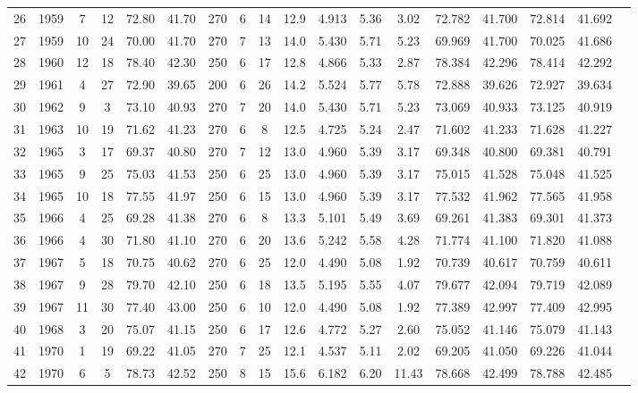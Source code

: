 \begin{longtable}{cccccccccccccccccc}
  26 & 1959 & 7 & 12 & 72.80 & 41.70 & 270 & 6 & 14 & 12.9 & 4.913 & 5.36 & 3.02 & 72.782 & 41.700 & 72.814 & 41.692 \\ 
  27 & 1959 & 10 & 24 & 70.00 & 41.70 & 270 & 7 & 13 & 14.0 & 5.430 & 5.71 & 5.23 & 69.969 & 41.700 & 70.025 & 41.686 \\ 
  28 & 1960 & 12 & 18 & 78.40 & 42.30 & 250 & 6 & 17 & 12.8 & 4.866 & 5.33 & 2.87 & 78.384 & 42.296 & 78.414 & 42.292 \\ 
  29 & 1961 & 4 & 27 & 72.90 & 39.65 & 200 & 6 & 26 & 14.2 & 5.524 & 5.77 & 5.78 & 72.888 & 39.626 & 72.927 & 39.634 \\ 
  30 & 1962 & 9 & 3 & 73.10 & 40.93 & 270 & 7 & 20 & 14.0 & 5.430 & 5.71 & 5.23 & 73.069 & 40.933 & 73.125 & 40.919 \\ 
  31 & 1963 & 10 & 19 & 71.62 & 41.23 & 270 & 6 & 8 & 12.5 & 4.725 & 5.24 & 2.47 & 71.602 & 41.233 & 71.628 & 41.227 \\ 
  32 & 1965 & 3 & 17 & 69.37 & 40.80 & 270 & 7 & 12 & 13.0 & 4.960 & 5.39 & 3.17 & 69.348 & 40.800 & 69.381 & 40.791 \\ 
  33 & 1965 & 9 & 25 & 75.03 & 41.53 & 250 & 6 & 25 & 13.0 & 4.960 & 5.39 & 3.17 & 75.015 & 41.528 & 75.048 & 41.525 \\ 
  34 & 1965 & 10 & 18 & 77.55 & 41.97 & 250 & 6 & 15 & 13.0 & 4.960 & 5.39 & 3.17 & 77.532 & 41.962 & 77.565 & 41.958 \\ 
  35 & 1966 & 4 & 25 & 69.28 & 41.38 & 270 & 6 & 8 & 13.3 & 5.101 & 5.49 & 3.69 & 69.261 & 41.383 & 69.301 & 41.373 \\ 
  36 & 1966 & 4 & 30 & 71.80 & 41.10 & 270 & 6 & 20 & 13.6 & 5.242 & 5.58 & 4.28 & 71.774 & 41.100 & 71.820 & 41.088 \\ 
  37 & 1967 & 5 & 18 & 70.75 & 40.62 & 270 & 6 & 25 & 12.0 & 4.490 & 5.08 & 1.92 & 70.739 & 40.617 & 70.759 & 40.611 \\ 
  38 & 1967 & 9 & 28 & 79.70 & 42.10 & 250 & 6 & 18 & 13.5 & 5.195 & 5.55 & 4.07 & 79.677 & 42.094 & 79.719 & 42.089 \\ 
  39 & 1967 & 11 & 30 & 77.40 & 43.00 & 250 & 6 & 10 & 12.0 & 4.490 & 5.08 & 1.92 & 77.389 & 42.997 & 77.409 & 42.995 \\ 
  40 & 1968 & 3 & 20 & 75.07 & 41.15 & 250 & 6 & 17 & 12.6 & 4.772 & 5.27 & 2.60 & 75.052 & 41.146 & 75.079 & 41.143 \\ 
  41 & 1970 & 1 & 19 & 69.22 & 41.05 & 270 & 7 & 25 & 12.1 & 4.537 & 5.11 & 2.02 & 69.205 & 41.050 & 69.226 & 41.044 \\ 
  42 & 1970 & 6 & 5 & 78.73 & 42.52 & 250 & 8 & 15 & 15.6 & 6.182 & 6.20 & 11.43 & 78.668 & 42.499 & 78.788 & 42.485 \\ 

\end{longtable}
